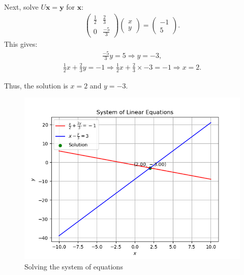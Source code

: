 \documentclass[journal]{IEEEtran}
\begin{document}
Next, solve $U \mathbf{x} = \mathbf{y}$ for $\mathbf{x}$:  
\begin{align}  
\begin{pmatrix} \frac{1}{2} & \frac{2}{3} \\ 0 & \frac{-5}{3} \end{pmatrix} \begin{pmatrix} x \\ y \end{pmatrix} = \begin{pmatrix} -1 \\ 5 \end{pmatrix}.  
\end{align}  
This gives:  
\begin{align}  
\frac{-5}{3}y = 5 \Rightarrow y = -3,  
\end{align}  
\begin{align}  
\frac{1}{2}x + \frac{2}{3}y = -1 \Rightarrow \frac{1}{2}x + \frac{2}{3}\times -3 = -1 \Rightarrow x = 2.  
\end{align}  

Thus, the solution is $x = 2$ and $y = -3$.  

 
\begin{figure}[h!]
   \centering
   \includegraphics[width=1\columnwidth]{figs/Fig1.png}
   \caption{Solving the system of equations}
   \label{stemplot}
\end{figure}
\end{document}
